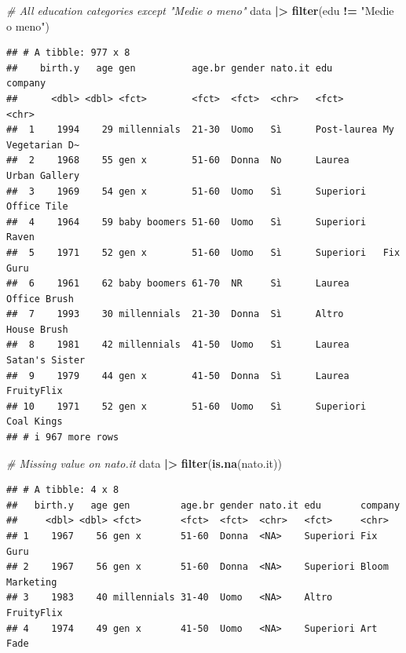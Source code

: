 \documentclass[
]{book}
\newenvironment{Shaded}{\begin{snugshade}}{\end{snugshade}}
\newcommand{\CommentTok}[1]{\textcolor[rgb]{0.56,0.35,0.01}{\textit{#1}}}
\newcommand{\FunctionTok}[1]{\textcolor[rgb]{0.13,0.29,0.53}{\textbf{#1}}}
\newcommand{\NormalTok}[1]{#1}
\newcommand{\SpecialCharTok}[1]{\textcolor[rgb]{0.81,0.36,0.00}{\textbf{#1}}}
\newcommand{\StringTok}[1]{\textcolor[rgb]{0.31,0.60,0.02}{#1}}
\begin{document}
\begin{Shaded}
\begin{Highlighting}[]
\CommentTok{\# All education categories except "Medie o meno"}
\NormalTok{data }\SpecialCharTok{|\textgreater{}} 
  \FunctionTok{filter}\NormalTok{(edu }\SpecialCharTok{!=} \StringTok{"Medie o meno"}\NormalTok{)}
\end{Highlighting}
\end{Shaded}

\begin{verbatim}
## # A tibble: 977 x 8
##    birth.y   age gen          age.br gender nato.it edu         company         
##      <dbl> <dbl> <fct>        <fct>  <fct>  <chr>   <fct>       <chr>           
##  1    1994    29 millennials  21-30  Uomo   Sì      Post-laurea My Vegetarian D~
##  2    1968    55 gen x        51-60  Donna  No      Laurea      Urban Gallery   
##  3    1969    54 gen x        51-60  Uomo   Sì      Superiori   Office Tile     
##  4    1964    59 baby boomers 51-60  Uomo   Sì      Superiori   Raven           
##  5    1971    52 gen x        51-60  Uomo   Sì      Superiori   Fix Guru        
##  6    1961    62 baby boomers 61-70  NR     Sì      Laurea      Office Brush    
##  7    1993    30 millennials  21-30  Donna  Sì      Altro       House Brush     
##  8    1981    42 millennials  41-50  Uomo   Sì      Laurea      Satan's Sister  
##  9    1979    44 gen x        41-50  Donna  Sì      Laurea      FruityFlix      
## 10    1971    52 gen x        51-60  Uomo   Sì      Superiori   Coal Kings      
## # i 967 more rows
\end{verbatim}

\begin{Shaded}
\begin{Highlighting}[]
\CommentTok{\# Missing value on nato.it}
\NormalTok{data }\SpecialCharTok{|\textgreater{}} 
  \FunctionTok{filter}\NormalTok{(}\FunctionTok{is.na}\NormalTok{(nato.it))}
\end{Highlighting}
\end{Shaded}

\begin{verbatim}
## # A tibble: 4 x 8
##   birth.y   age gen         age.br gender nato.it edu       company        
##     <dbl> <dbl> <fct>       <fct>  <fct>  <chr>   <fct>     <chr>          
## 1    1967    56 gen x       51-60  Donna  <NA>    Superiori Fix Guru       
## 2    1967    56 gen x       51-60  Donna  <NA>    Superiori Bloom Marketing
## 3    1983    40 millennials 31-40  Uomo   <NA>    Altro     FruityFlix     
## 4    1974    49 gen x       41-50  Uomo   <NA>    Superiori Art Fade
\end{verbatim}
\end{document}
